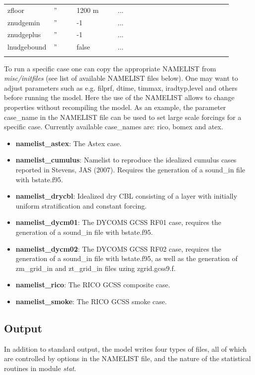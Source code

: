 \documentclass[11pt,a4paper]{article}
\begin{document}
\begin{longtable}[htb]{p{0.12\linewidth}p{0.1\linewidth}p{0.18\linewidth}p{0.5\linewidth}}
zfloor       &  ''  & 1200 m              & ...                                                   \\
znudgemin    &  ''  & -1                  & ...                                                   \\
znudgeplus   &  ''  & -1                  & ...                                                   \\
lnudgebound  &  ''  & false               & ...                                                   \\
\hline
\hline
\label{tbl:namelist}
\end{longtable}
To run a specific case one can copy the appropriate NAMELIST from
\emph{misc/initfiles} (see list of available NAMELIST files below).
One may want to adjust parameters such as e.g. filprf, dtime,
timmax, iradtyp,level and others before running the model.
Here the use of the NAMELIST allows to change properties
without recompiling the model. As an example, the parameter
case\_name in the NAMELIST file can be used to set large scale
forcings for a specific case. Currently available case\_names
are: rico, bomex and atex.

\begin{itemize}
\item \textbf{namelist\_astex}: The Astex case.
\item \textbf{namelist\_cumulus}: Namelist to reproduce the idealized
cumulus cases reported in Stevens, JAS (2007). Requires the
generation of a sound\_in file with bstate.f95.
\item \textbf{namelist\_drycbl}: Idealized dry CBL consisting of a
layer with initially uniform stratification and constant forcing.
\item \textbf{namelist\_dycm01}: The DYCOMS GCSS RF01 case, requires
the generation of a sound\_in file with bstate.f95.
\item \textbf{namelist\_dycm02}: The DYCOMS GCSS RF02 case, requires
the generation of a sound\_in file with bstate.f95, as well as the
generation of zm\_grid\_in and zt\_grid\_in files uzing zgrid.gcss9.f.
\item \textbf{namelist\_rico}: The RICO GCSS composite case.
\item \textbf{namelist\_smoke}: The RICO GCSS smoke case.
\end{itemize}

\subsection{Output}
In addition to standard output, the model writes four types of files,
all of which are controlled by options in the NAMELIST file, and the
nature of the statistical routines in module \emph{stat}.
\end{document}

